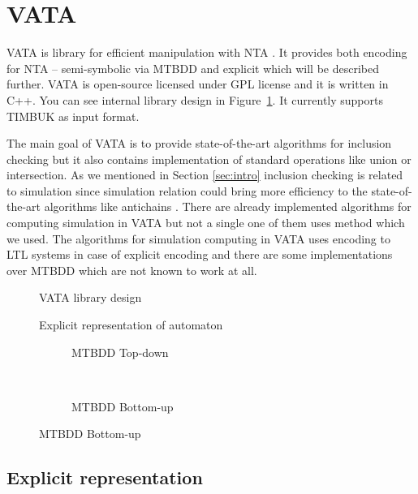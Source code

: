 \documentclass[a4paper, 12pt]{article}
\begin{document}
\section{VATA}
\label{sec:vata}
VATA is library for efficient manipulation with NTA \cite{libvata}.
It provides both encoding for NTA -- semi-symbolic via MTBDD and explicit which will be described further.
VATA is open-source licensed under GPL license and it is written in C++. You can see internal library design in Figure~\ref{fig:lib_design}.
It currently supports TIMBUK as input format. 

The main goal of VATA is to provide state-of-the-art algorithms for inclusion checking
but it also contains implementation of standard operations like union or intersection.
As we mentioned in Section \ref{sec:intro} inclusion checking is related to simulation
since simulation relation could bring more efficiency to the state-of-the-art algorithms like antichains \cite{tacas10}.
There are already implemented algorithms for computing simulation in VATA but not a single one of them uses method which we used.
The algorithms for simulation computing in VATA uses encoding to LTL systems \cite{tacas08} in case of explicit encoding
and there are some implementations over MTBDD which are not known to work at all.

\begin{figure}[h]
	\centering
	
	\caption{VATA library design}
	\label{fig:lib_design}
\end{figure}

\begin{figure}[h]
	\centering
	
	\caption{Explicit representation of automaton}
	\label{fig:explicit}
\end{figure}

\begingroup
{}%
\begin{figure}[h]
	\centering
	\begin{subfigure}{.5\textwidth}
		\centering
		
		\caption{MTBDD Top-down}
		\label{fig:mtbdd_td}
	\end{subfigure}%
	~
	\begin{subfigure}{.5\textwidth}
	\centering
	
	\caption{MTBDD Bottom-up}
	\label{fig:mtbdd_bu}
	\end{subfigure}%
\end{figure}
\endgroup

\subsection{Explicit representation}
\end{document}
